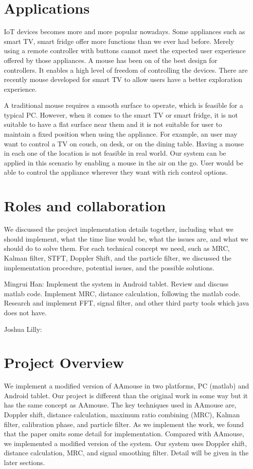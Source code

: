 \documentclass{acm_proc_article-sp}
\begin{document}
\section{Applications} \label{applications}
IoT devices becomes more and more popular nowadays. Some appliances
such as smart TV, smart fridge offer more functions than we ever
had before. Merely using a remote controller with buttons cannot meet
the expected user experience offered by those appliances. A mouse has
been on of the best design for controllers. It enables a high level of 
freedom of controlling the devices. There are recently mouse developed
for smart TV to allow users have a better exploration experience. 

A traditional mouse requires a smooth surface to operate, which is 
feasible for a typical PC. However, when it comes to the smart TV
or smart fridge, it is not suitable to have a flat surface near them
and it is not suitable for user to maintain a fixed position when
using the appliance. For example, an user may want to control a TV 
on couch, on desk, or on the dining table. Having a mouse in each
one of the location is not feasible in real world. Our system can be
applied in this scenario by enabling a mouse in the air on the go.
User would be able to control the appliance wherever they want with
rich control options.



\section{Roles and collaboration} \label{roles and collaboration}
We discussed the project implementation details together, including
what we should implement, what the time line would be, what the issues
are, and what we should do to solve them. For each technical concept
we need, such as MRC, Kalman filter, STFT, Doppler Shift, and the
particle filter, we discussed the implementation procedure, 
potential issues, and the possible solutions.

Mingrui Han: Implement the system in Android tablet. Review and discuss matlab code. Implement MRC, distance calculation, following
the matlab code. 
Research and implement FFT, signal filter, and other third party 
tools which java does not have.  

Joshua Lilly:

\section{Project Overview} \label{project_overview}
We implement a modified version of AAmouse in two platforms, PC
(matlab) and Android tablet. Our project is different than the 
original work in some way but it has the same concept as AAmouse.
The key techniques used in AAmouse are, Doppler shift, distance
calculation,  maximum ratio combining (MRC), Kalman filter,
calibration phase, and particle filter. As we implement the work,
we found that the paper omits some detail for implementation. 
Compared with AAmouse, we implemented a modified version of the 
system. Our system uses Doppler shift, distance calculation, 
MRC, and signal smoothing filter. Detail will be given in the later 
sections. 
\end{document}
